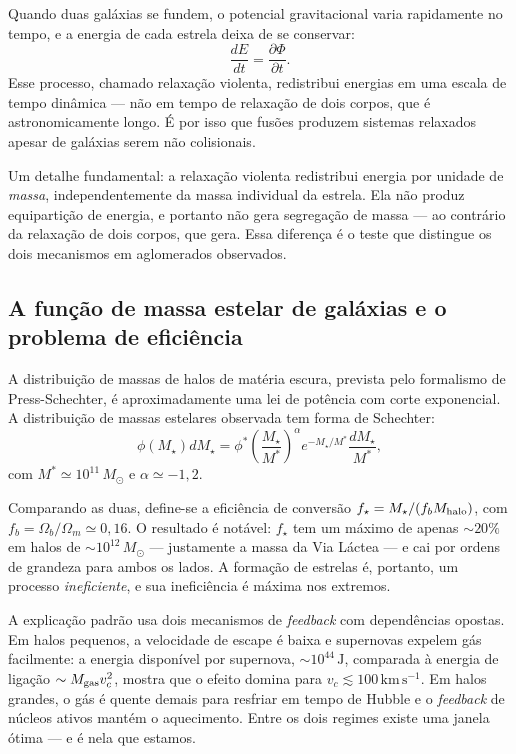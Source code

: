 \documentclass[11pt,a4paper]{article}
\begin{document}
Quando duas galáxias se fundem, o potencial gravitacional varia rapidamente no tempo, e a energia de cada estrela deixa de se conservar:
\[
\frac{dE}{dt}=\frac{\partial\Phi}{\partial t}.
\]
Esse processo, chamado relaxação violenta, redistribui energias em uma escala de tempo dinâmica --- não em tempo de relaxação de dois corpos, que é astronomicamente longo. É por isso que fusões produzem sistemas relaxados apesar de galáxias serem não colisionais.

Um detalhe fundamental: a relaxação violenta redistribui energia por unidade de \emph{massa}, independentemente da massa individual da estrela. Ela não produz equipartição de energia, e portanto não gera segregação de massa --- ao contrário da relaxação de dois corpos, que gera. Essa diferença é o teste que distingue os dois mecanismos em aglomerados observados.

\subsection*{A função de massa estelar de galáxias e o problema de eficiência}

A distribuição de massas de halos de matéria escura, prevista pelo formalismo de Press-Schechter, é aproximadamente uma lei de potência com corte exponencial. A distribuição de massas estelares observada tem forma de Schechter:
\[
\phi(M_\star)dM_\star=\phi^{*}\left(\frac{M_\star}{M^{*}}\right)^{\alpha}e^{-M_\star/M^{*}}\frac{dM_\star}{M^{*}},
\]
com $M^{*}\simeq10^{11}\,M_\odot$ e $\alpha\simeq-1{,}2$.

Comparando as duas, define-se a eficiência de conversão $f_\star=M_\star/(f_bM_{\rm halo})$, com $f_b=\Omega_b/\Omega_m\simeq0{,}16$. O resultado é notável: $f_\star$ tem um máximo de apenas $\sim20\%$ em halos de $\sim10^{12}\,M_\odot$ --- justamente a massa da Via Láctea --- e cai por ordens de grandeza para ambos os lados. A formação de estrelas é, portanto, um processo \emph{ineficiente}, e sua ineficiência é máxima nos extremos.

A explicação padrão usa dois mecanismos de \textit{feedback} com dependências opostas. Em halos pequenos, a velocidade de escape é baixa e supernovas expelem gás facilmente: a energia disponível por supernova, $\sim10^{44}\,\mathrm{J}$, comparada à energia de ligação $\sim M_{\rm gas}v_c^{2}$, mostra que o efeito domina para $v_c\lesssim100\,\mathrm{km\,s^{-1}}$. Em halos grandes, o gás é quente demais para resfriar em tempo de Hubble e o \textit{feedback} de núcleos ativos mantém o aquecimento. Entre os dois regimes existe uma janela ótima --- e é nela que estamos.
\end{document}
